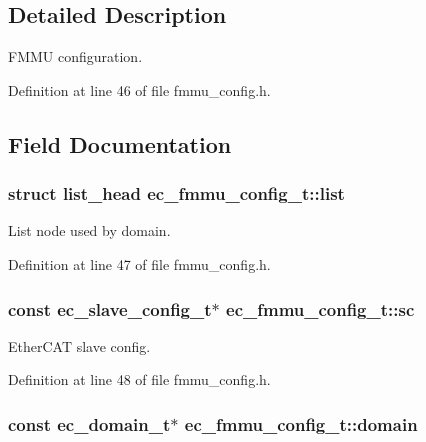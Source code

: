 \subsection{Detailed Description}
F\-M\-M\-U configuration. 

Definition at line 46 of file fmmu\-\_\-config.\-h.



\subsection{Field Documentation}
\subsubsection[{list}]{\setlength{\rightskip}{0pt plus 5cm}struct list\-\_\-head ec\-\_\-fmmu\-\_\-config\-\_\-t\-::list}\label{structec__fmmu__config__t_add81ada7f3febb9faf5c068a8f81b28a}


List node used by domain. 



Definition at line 47 of file fmmu\-\_\-config.\-h.

\subsubsection[{sc}]{\setlength{\rightskip}{0pt plus 5cm}const {\bf ec\-\_\-slave\-\_\-config\-\_\-t}$\ast$ ec\-\_\-fmmu\-\_\-config\-\_\-t\-::sc}\label{structec__fmmu__config__t_a9833400867ab8e59c3eede3e47f8a8fb}


Ether\-C\-A\-T slave config. 



Definition at line 48 of file fmmu\-\_\-config.\-h.

\subsubsection[{domain}]{\setlength{\rightskip}{0pt plus 5cm}const {\bf ec\-\_\-domain\-\_\-t}$\ast$ ec\-\_\-fmmu\-\_\-config\-\_\-t\-::domain}\label{structec__fmmu__config__t_a189c237bbb083b9ef1924673026de193}


